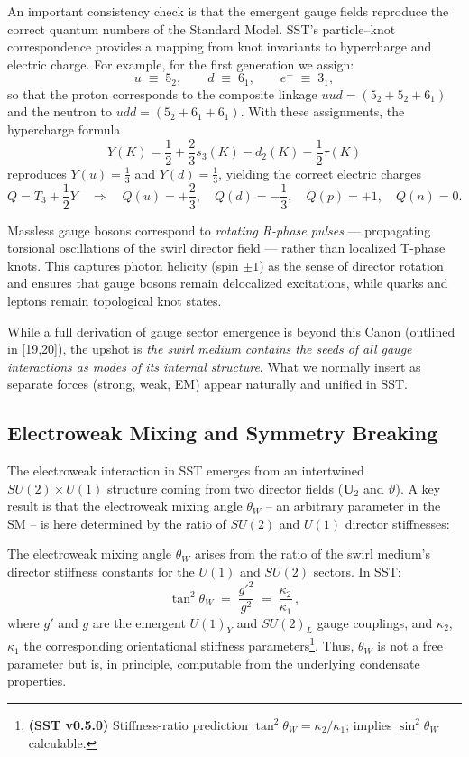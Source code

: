 \documentclass[reprint,aps,onecolumn,nofootinbib]{revtex4-2}
\begin{document}
    \noindent
    An important consistency check is that the emergent gauge fields reproduce the correct quantum numbers of the Standard Model.
    SST’s particle–knot correspondence provides a mapping from knot invariants to hypercharge and electric charge.
    For example, for the first generation we assign:
    \[
        u \;\equiv\; 5_2, \qquad d \;\equiv\; 6_1, \qquad e^- \;\equiv\; 3_1,
    \]
    so that the proton corresponds to the composite linkage $uud = (5_2 + 5_2 + 6_1)$ and the neutron to $udd = (5_2 + 6_1 + 6_1)$.
    With these assignments, the hypercharge formula
    \[
        Y(K) = \frac{1}{2} + \frac{2}{3}s_3(K) - d_2(K) - \frac{1}{2}\tau(K)
    \]
    reproduces $Y(u) = \tfrac{1}{3}$ and $Y(d) = \tfrac{1}{3}$, yielding the correct electric charges
    \[
        Q = T_3 + \frac{1}{2}Y \quad \Rightarrow \quad
        Q(u) = +\frac{2}{3}, \quad Q(d) = -\frac{1}{3}, \quad Q(p)=+1, \quad Q(n)=0.
    \]

    \noindent
    Massless gauge bosons correspond to \emph{rotating R-phase pulses} — propagating torsional oscillations of the swirl director field — rather than localized T-phase knots.
    This captures photon helicity (spin $\pm 1$) as the sense of director rotation and ensures that gauge bosons remain delocalized excitations, while quarks and leptons remain topological knot states.



    While a full derivation of gauge sector emergence is beyond this Canon (outlined in [19,20]), the upshot is \emph{the swirl medium contains the seeds of all gauge interactions as modes of its internal structure}. What we normally insert as separate forces (strong, weak, EM) appear naturally and unified in SST.

    \subsection{Electroweak Mixing and Symmetry Breaking}
        The electroweak interaction in SST emerges from an intertwined $SU(2)\times U(1)$ structure coming from two director fields ($\mathbf{U}_2$ and $\vartheta$). A key result is that the electroweak mixing angle $\theta_W$ – an arbitrary parameter in the SM – is here determined by the ratio of $SU(2)$ and $U(1)$ director stiffnesses:

        \begin{tcolorbox}[title=Theorem 6.2: Weak Mixing Angle from First Principles]
        The electroweak mixing angle $\theta_W$ arises from the ratio of the swirl medium’s director stiffness constants for the $U(1)$ and $SU(2)$ sectors. In SST:
        \[
            \tan^2 \theta_W \;=\; \frac{g'^2}{g^2} \;=\; \frac{\kappa_2}{\kappa_1}\,,
        \]
        where $g'$ and $g$ are the emergent $U(1)_Y$ and $SU(2)_L$ gauge couplings, and $\kappa_2$, $\kappa_1$ the corresponding orientational stiffness parameters\footnote{\textbf{(SST v0.5.0)} Stiffness-ratio prediction $\tan^2\theta_W=\kappa_2/\kappa_1$; implies $\sin^2\theta_W$ calculable.}. Thus, $\theta_W$ is not a free parameter but is, in principle, computable from the underlying condensate properties.
        \end{tcolorbox}
\end{document}
